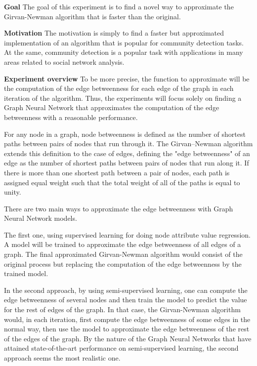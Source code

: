 \textbf{Goal}
The goal of this experiment is to find a novel way to approximate the Girvan-Newman algorithm that is faster than the original.


\textbf{Motivation}
The motivation is simply to find a faster but approximated implementation of an algorithm that is popular for community detection tasks. At the same, community detection is a popular task with applications in many areas related to social network analysis.


\textbf{Experiment overview}
To be more precise, the function to approximate will be the computation of the edge betweenness for each edge of the graph in each iteration of the algorithm. Thus, the experiments will focus solely on finding a Graph Neural Network that approximates the computation of the edge betweenness with a reasonable performance.

For any node in a graph, node betweenness is defined as the number of shortest paths between pairs of nodes that run through it. The Girvan–Newman algorithm extends this definition to the case of edges, defining the "edge betweenness" of an edge as the number of shortest paths between pairs of nodes that run along it. If there is more than one shortest path between a pair of nodes, each path is assigned equal weight such that the total weight of all of the paths is equal to unity.

There are two main ways to approximate the edge betweenness with Graph Neural Network models. 

The first one, using supervised learning for doing node attribute value regression. A model will be trained to approximate the edge betweenness of all edges of a graph. The final approximated Girvan-Newman algorithm would consist of the original process but replacing the computation of the edge betweenness by the trained model.


In the second approach, by using semi-supervised learning, one can compute the edge betweenness of several nodes and then train the model to predict the value for the rest of edges of the graph. In that case, the Girvan-Newman algorithm would, in each iteration, first compute the edge betweenness of some edges in the normal way, then use the model to approximate the edge betweenness of the rest of the edges of the graph. By the nature of the Graph Neural Networks that have attained state-of-the-art performance on semi-supervised learning, the second approach seems the most realistic one.


